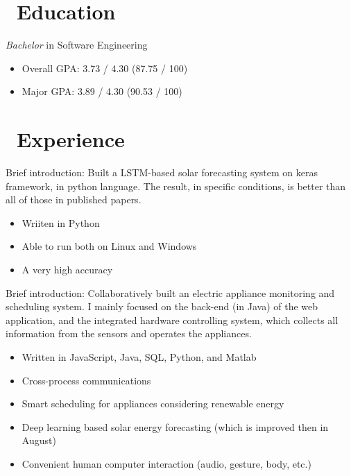 \documentclass{resume}
\begin{document}



\section{\faGraduationCap\ Education}
\textit{Bachelor} in Software Engineering
\begin{itemize}
  \item Overall GPA: 3.73 / 4.30 (87.75 / 100)
  \item Major GPA: 3.89 / 4.30 (90.53 / 100)
\end{itemize}

\section{\faUsers\ Experience}
Brief introduction: Built a LSTM-based solar forecasting system on keras framework, in python language. The result, in specific conditions, is better than all of those in published papers.
\begin{itemize}
  \item Wriiten in Python
  \item Able to run both on Linux and Windows
  \item A very high accuracy
\end{itemize}


Brief introduction: Collaboratively built an electric appliance monitoring and scheduling system. I mainly focused on the back-end (in Java) of the web application, and the integrated hardware controlling system, which collects all information from the sensors and operates the appliances.
\begin{itemize}
  \item Written in JavaScript, Java, SQL, Python, and Matlab
  \item Cross-process communications 
  \item Smart scheduling for appliances considering renewable energy
  \item Deep learning based solar energy forecasting (which is improved then in August)
  \item Convenient human computer interaction (audio, gesture, body, etc.)
\end{itemize}
\end{document}
